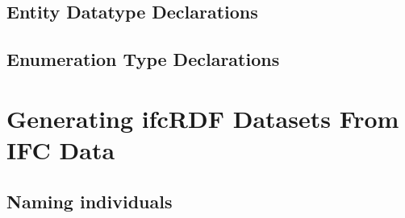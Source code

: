 


\subsection{Entity Datatype Declarations}

\subsection{Enumeration Type Declarations}
\label{ifcOWL:enum-types}



\section{Generating ifcRDF Datasets From IFC Data}


\subsection{Naming individuals}
\label{ifcRDF:naming-individuals}